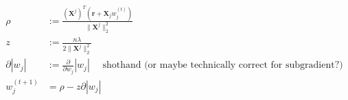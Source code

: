 \newcommand{\matrix}[1]{\mathbf{#1}}
\newcommand{\vector}[1]{\mathbf{#1}}
\newcommand{\X}{\matrix{X}}
\newcommand{\y}{\vector{y}}
\newcommand{\w}{\vector{w}}
\newcommand{\r}{\vector{r}}
\begin{align*}
\rho &:= \frac{(\X^j)^T (\r + \X_j w_j^{(t)})}{{\|\X^j\|_2^2}} \\
z &:= \frac{n \lambda}{2 {\|\X^j\|_2^2}} \\
\partial |w_j| &:= \frac{\partial}{\partial w_j}|w_j| \quad \text{ shothand (or maybe technically correct for subgradient?)} \\
w_j^{(t+1)} &= \rho - z \partial |w_j| \\
\end{align*}
